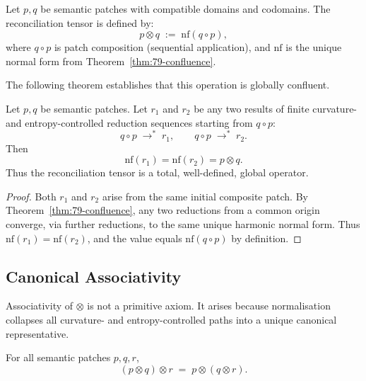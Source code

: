 Let $p,q$ be semantic patches with compatible domains and codomains.
The reconciliation tensor is defined by:
\[
p \otimes q \;:=\; \mathrm{nf}(q \circ p),
\]
where $q \circ p$ is patch composition (sequential application),
and $\mathrm{nf}$ is the unique normal form from Theorem~\ref{thm:79-confluence}.

The following theorem establishes that this operation is globally confluent.

\begin{theorem}
\label{thm:79-global-confluence}
Let $p,q$ be semantic patches.  
Let $r_1$ and $r_2$ be any two results of finite curvature- and entropy-controlled
reduction sequences starting from $q \circ p$:
\[
q \circ p \;\longrightarrow^{\!*}\; r_1,
\qquad
q \circ p \;\longrightarrow^{\!*}\; r_2.
\]
Then
\[
\mathrm{nf}(r_1) = \mathrm{nf}(r_2) = p \otimes q.
\]
Thus the reconciliation tensor is a total, well-defined, global operator.
\end{theorem}

\begin{proof}
Both $r_1$ and $r_2$ arise from the same initial composite patch.
By Theorem~\ref{thm:79-confluence}, any two reductions from a common origin
converge, via further reductions, to the same unique harmonic normal form.
Thus $\mathrm{nf}(r_1) = \mathrm{nf}(r_2)$, and the value equals
$\mathrm{nf}(q \circ p)$ by definition.
\end{proof}

\subsection{Canonical Associativity}
\label{subsec:79-4-associativity}

Associativity of $\otimes$ is not a primitive axiom.  
It arises because normalisation collapses all curvature- and entropy-controlled
paths into a unique canonical representative.

\begin{theorem}
\label{thm:79-associativity}
For all semantic patches $p,q,r$,
\[
(p \otimes q) \otimes r
\;=\;
p \otimes (q \otimes r).
\]
\end{theorem}

